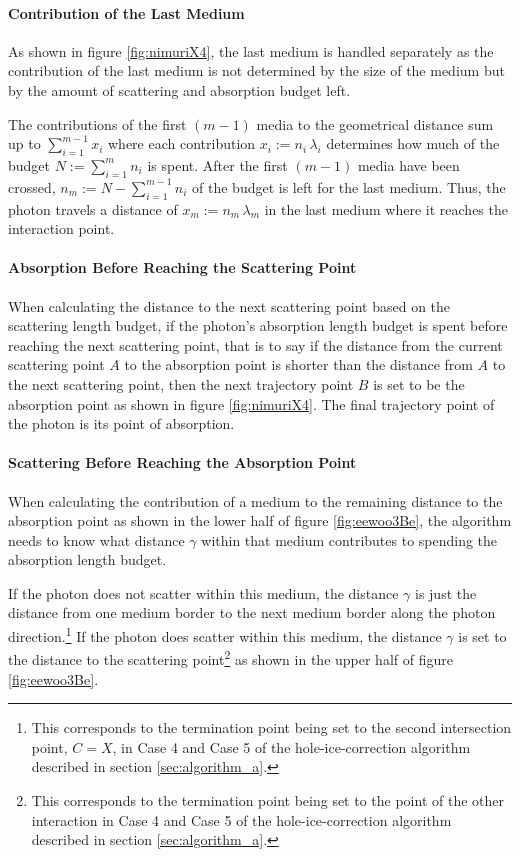 \paragraph{Contribution of the Last Medium}
As shown in figure \ref{fig:nimuriX4}, the last medium is handled separately as the contribution of the last medium is not determined by the size of the medium but by the amount of scattering and absorption budget left.

The contributions of the first $(m-1)$ media to the geometrical distance sum up to $\sum_{i=1}^{m-1} x_i$ where each contribution $x_i := n_i\,\lambda_i$ determines how much of the budget $N:=\sum_{i=1}^m n_i$ is spent. After the first $(m-1)$ media have been crossed, $n_m := N - \sum_{i=1}^{m-1} n_i$ of the budget is left for the last medium. Thus, the photon travels a distance of $x_m := n_m\,\lambda_m$ in the last medium where it reaches the interaction point.

\paragraph{Absorption Before Reaching the Scattering Point}
When calculating the distance to the next scattering point based on the scattering length budget, if the photon's absorption length budget is spent before reaching the next scattering point, that is to say if the distance from the current scattering point $A$ to the absorption point is shorter than the distance from $A$ to the next scattering point, then the next trajectory point $B$ is set to be the absorption point as shown in figure \ref{fig:nimuriX4}. The final trajectory point of the photon is its point of absorption.

\paragraph{Scattering Before Reaching the Absorption Point}
When calculating the contribution of a medium to the remaining distance to the absorption point as shown in the lower half of figure \ref{fig:eewoo3Be}, the algorithm needs to know what distance $\gamma$ within that medium contributes to spending the absorption length budget.

If the photon does not scatter within this medium, the distance $\gamma$ is just the distance from one medium border to the next medium border along the photon direction.\footnote{This corresponds to the termination point being set to the second intersection point, $C = X$, in Case 4 and Case 5 of the hole-ice-correction algorithm described in section \ref{sec:algorithm_a}.}
If the photon does scatter within this medium, the distance $\gamma$ is set to the distance to the scattering point\footnote{This corresponds to the termination point being set to the point of the other interaction in Case 4 and Case 5 of the hole-ice-correction algorithm described in section \ref{sec:algorithm_a}.} as shown in the upper half of figure \ref{fig:eewoo3Be}.


